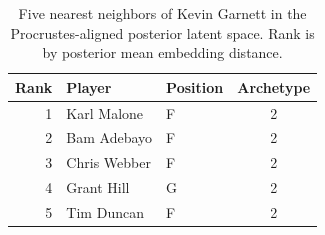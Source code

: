 \begin{table}[htbp]
  \centering\small
  \begin{tabular}{rllc}
    \toprule
    Rank & Player & Position & Archetype \\
    \midrule
    1 & Karl Malone & F & 2 \\
    2 & Bam Adebayo & F & 2 \\
    3 & Chris Webber & F & 2 \\
    4 & Grant Hill & G & 2 \\
    5 & Tim Duncan & F & 2 \\
    \bottomrule
  \end{tabular}
  \caption{Five nearest neighbors of Kevin Garnett in the Procrustes-aligned posterior latent space. Rank is by posterior mean embedding distance.}
  \label{tab:Kevin_Garnett_neighbors}
\end{table}

